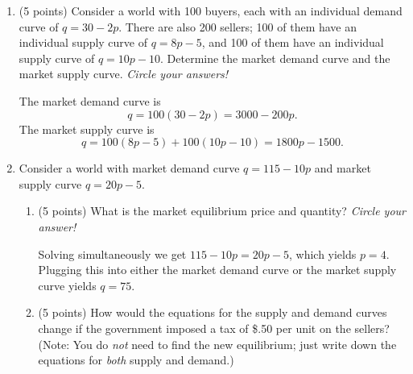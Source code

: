\documentclass{article}
\begin{document}
\begin{enumerate}
\begin{enumerate}
\begin{EXAM} \clearpage \end{EXAM} 

\end{enumerate}










\item \begin{EXAM} (5 points) Consider a world with 100 buyers, each with an individual demand curve of $q=30-2p$. There are also 200 sellers; 100 of them have an individual supply curve of $q=8p-5$, and 100 of them have an individual supply curve of $q=10p-10.$ Determine the market demand curve and the market supply curve. \emph{Circle your answers!} \vspace{4cm} \end{EXAM}

\begin{KEY} The market demand curve is \[ q=100(30-2p)=3000-200p.\] The market supply curve is \[q=100(8p-5)+100(10p-10)=1800p-1500.\] \end{KEY}














\item \begin{EXAM} Consider a world with market demand curve $q=115-10p$ and market supply curve $q=20p-5$. \end{EXAM} 
    \begin{enumerate}

    \item \begin{EXAM}(5 points) What is the market equilibrium price and quantity? \emph{Circle your answer!} \vspace{4cm} \end{EXAM}

\begin{KEY} Solving simultaneously we get $115-10p=20p-5$, which yields $p=4$. Plugging this into either the market demand curve or the market supply curve yields $q=75$.  \end{KEY}


    \item \begin{EXAM}(5 points) How would the equations for the supply and demand curves change if the government imposed a tax of \$.50 per unit on the sellers? (Note: You do \emph{not} need to find the new equilibrium; just write down the equations for \emph{both} supply and demand.) \vspace{3cm} \end{EXAM}


\end{enumerate}
\end{enumerate}
\end{document}
